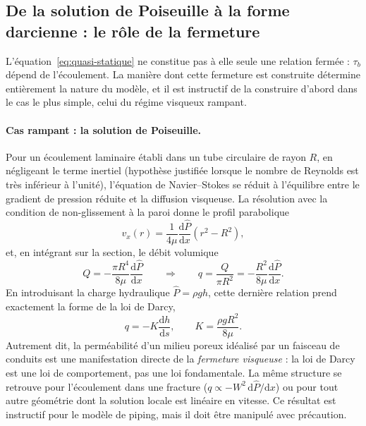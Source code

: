 \documentclass[11pt,a4paper]{report}
\newcommand{\Chat}{\hat{P}}
\begin{document}
\subsection{De la solution de Poiseuille à la forme darcienne : le rôle de la fermeture}
\label{sec:poiseuille}

L'équation~\eqref{eq:quasi-statique} ne constitue pas à elle seule une relation fermée : \(\tau_b\)
dépend de l'écoulement. La manière dont cette fermeture est construite détermine entièrement la nature
du modèle, et il est instructif de la construire d'abord dans le cas le plus simple, celui du régime
visqueux rampant.

\paragraph{Cas rampant : la solution de Poiseuille.} Pour un écoulement laminaire établi dans un tube
circulaire de rayon \(R\), en négligeant le terme inertiel (hypothèse justifiée lorsque le nombre de
Reynolds est très inférieur à l'unité), l'équation de Navier--Stokes se réduit à l'équilibre entre le
gradient de pression réduite et la diffusion visqueuse. La résolution avec la condition de non-glissement
à la paroi donne le profil parabolique
\begin{equation}
v_x(r) = \frac{1}{4\mu}\frac{\mathrm{d}\Chat}{\mathrm{d}x}\left(r^2 - R^2\right),
\label{eq:poiseuille}
\end{equation}
et, en intégrant sur la section, le débit volumique
\begin{equation}
Q = -\frac{\pi R^4}{8\mu}\frac{\mathrm{d}\Chat}{\mathrm{d}x}
\qquad\Longrightarrow\qquad
q = \frac{Q}{\pi R^2} = -\frac{R^2}{8\mu}\frac{\mathrm{d}\Chat}{\mathrm{d}x}.
\label{eq:poiseuille-q}
\end{equation}
En introduisant la charge hydraulique \(\Chat = \rho g h\), cette dernière relation prend exactement la
forme de la loi de Darcy,
\begin{equation}
q = -K\frac{\mathrm{d}h}{\mathrm{d}s},
\qquad
K = \frac{\rho g R^2}{8\mu} .
\label{eq:darcy}
\end{equation}
Autrement dit, la perméabilité d'un milieu poreux idéalisé par un faisceau de conduits est une
manifestation directe de la \emph{fermeture visqueuse} : la loi de Darcy est une loi de comportement,
pas une loi fondamentale. La même structure se retrouve pour l'écoulement dans une fracture
(\(q \propto -W^2\,\mathrm{d}\Chat/\mathrm{d}x\)) ou pour tout autre géométrie dont la solution locale
est linéaire en vitesse. Ce résultat est instructif pour le modèle de piping, mais il doit être manipulé
avec précaution.
\end{document}

